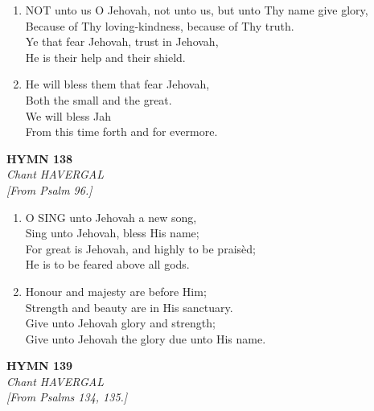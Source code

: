 \documentclass[11pt,a4paper]{article}
\begin{document}
\begin{enumerate}
    \item NOT unto us O Jehovah, not unto us, but unto Thy name give glory, \\
        Because of Thy loving-kindness, because of Thy truth. \\
        Ye that fear Jehovah, trust in Jehovah, \\
        He is their help and their shield.

    \item He will bless them that fear Jehovah, \\
        Both the small and the great. \\
        We will bless Jah \\
        From this time forth and for evermore.

\end{enumerate}

\newpage
\begin{center}
    {\Large \textbf{HYMN 138}}
    \\
    \textit{Chant HAVERGAL}
    \\
    \textit{\small [From Psalm 96.]}
\end{center}
\vspace{1em}

\begin{enumerate}
    \item O SING unto Jehovah a new song, \\
        Sing unto Jehovah, bless His name; \\
        For great is Jehovah, and highly to be prais\`ed; \\
        He is to be feared above all gods.

    \item Honour and majesty are before Him; \\
        Strength and beauty are in His sanctuary. \\
        Give unto Jehovah glory and strength; \\
        Give unto Jehovah the glory due unto His name.

\end{enumerate}

\newpage
\begin{center}
    {\Large \textbf{HYMN 139}}
    \\
    \textit{Chant HAVERGAL}
    \\
    \textit{\small [From Psalms 134, 135.]}
\end{center}
\vspace{1em}
\end{document}
